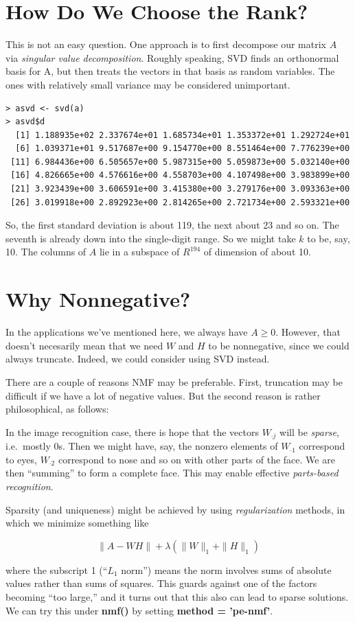 \section{How Do We Choose the Rank?}

This is not an easy question.  One approach is to first decompose our
matrix $A$ via {\it singular value decomposition}.  Roughly speaking,
SVD finds an orthonormal basis for A, but then treats the vectors in
that basis as random variables.  The ones with relatively small variance
may be considered unimportant.

\begin{lstlisting}
> asvd <- svd(a)
> asvd$d
  [1] 1.188935e+02 2.337674e+01 1.685734e+01 1.353372e+01 1.292724e+01
  [6] 1.039371e+01 9.517687e+00 9.154770e+00 8.551464e+00 7.776239e+00
 [11] 6.984436e+00 6.505657e+00 5.987315e+00 5.059873e+00 5.032140e+00
 [16] 4.826665e+00 4.576616e+00 4.558703e+00 4.107498e+00 3.983899e+00
 [21] 3.923439e+00 3.606591e+00 3.415380e+00 3.279176e+00 3.093363e+00
 [26] 3.019918e+00 2.892923e+00 2.814265e+00 2.721734e+00 2.593321e+00
\end{lstlisting}

So, the first standard deviation is about 119, the next about 23 and so
on.  The seventh is already down into the single-digit range.  So we
might take $k$ to be, say, 10.  The columns of $A$ lie in a subspace of
$R^{194}$ of dimension of about 10.

\section{Why Nonnegative?}

In the applications we've mentioned here, we always have $A \geq 0$.
However, that doesn't necesarily mean that we need $W$ and $H$ to be
nonnegative, since we could always truncate.  Indeed, we could consider
using SVD instead.

There are a couple of reasons NMF may be preferable.  First, truncation
may be difficult if we have a lot of negative values.  But the second
reason is rather philosophical, as follows:

In the image recognition case, there is hope that the vectors $W_{\cdot
j}$ will be {\it sparse}, i.e.\ mostly 0s. Then we might have, say, the
nonzero elements of $W_{\cdot 1}$ correspond to eyes, $W_{\cdot 2}$
correspond to nose and so on with other parts of the face.  We are then
``summing'' to form a complete face.  This may enable effective {\it
parts-based recognition}.

Sparsity (and uniqueness) might be achieved by using {\it
regularization} methods, in which we minimize something like

\begin{equation}
\|A - WH\| + \lambda (\|W\|_1 + \|H\|_1)
\end{equation}

where the subscript 1 (``$L_1$ norm'') means the norm involves sums of
absolute values rather than sums of squares.  This guards against one of
the factors becoming ``too large,'' and it turns out that this also can
lead to sparse solutions.  We can try this under {\bf nmf()}  by setting
{\bf method = 'pe-nmf'}.


